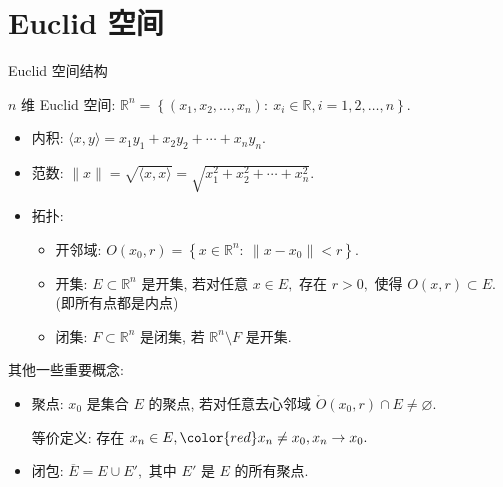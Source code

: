 
\section{Euclid 空间}


\begin{frame}{Euclid 空间结构}

$n$ 维 Euclid 空间: $\mathbb{R}^n = \left\{ (x_1, x_2, \dots, x_n): ~ x_i \in \mathbb{R}, i = 1, 2, \dots, n \right\}.$

\begin{itemize}
\item 内积: $\langle x, y \rangle = x_1 y_1 + x_2 y_2 + \cdots + x_n y_n.$
\pause
\item 范数: $\lVert x \rVert = \sqrt{\langle x, x \rangle} = \sqrt{x_1^2 + x_2^2 + \cdots + x_n^2}.$
\pause
\item 拓扑:
\begin{itemize}
\item 开邻域: $O(x_0, r) = \left\{ x \in \mathbb{R}^n: ~ \lVert x - x_0 \rVert < r \right\}.$
\pause
\item 开集: $E \subset \mathbb{R}^n$ 是开集, 若对任意 $x \in E,$ 存在 $r > 0,$ 使得 $O(x, r) \subset E.$ (即所有点都是内点)
\pause
\item 闭集: $F \subset \mathbb{R}^n$ 是闭集, 若 $\mathbb{R}^n \setminus F$ 是开集.
\end{itemize}
\end{itemize}

\pause

其他一些重要概念:
\begin{itemize}
\item 聚点: $x_0$ 是集合 $E$ 的聚点, 若对任意去心邻域 $\mathring{O}(x_0, r) \cap E \neq \varnothing.$ \par
等价定义: 存在 $x_n \in E, {\color{red} x_n \neq x_0}, x_n \to x_0.$
\pause
\item 闭包: $\overline{E} = E \cup E',$ 其中 $E'$ 是 $E$ 的所有聚点.
\end{itemize}

\end{frame}



